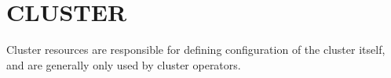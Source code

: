 \section{CLUSTER}

Cluster resources are responsible for defining configuration of the cluster itself, and are generally only used by cluster operators.


